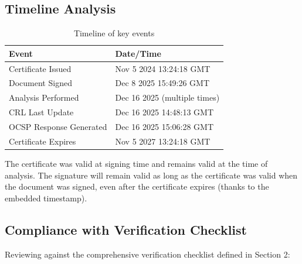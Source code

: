 \documentclass[12pt,a4paper]{article}
\begin{document}
\subsection{Timeline Analysis}

\begin{table}[H]
\centering
\begin{tabular}{ll}
\toprule
\textbf{Event} & \textbf{Date/Time} \\
\midrule
Certificate Issued & Nov 5 2024 13:24:18 GMT \\
Document Signed & Dec 8 2025 15:49:26 GMT \\
Analysis Performed & Dec 16 2025 (multiple times) \\
CRL Last Update & Dec 16 2025 14:48:13 GMT \\
OCSP Response Generated & Dec 16 2025 15:06:28 GMT \\
Certificate Expires & Nov 5 2027 13:24:18 GMT \\
\bottomrule
\end{tabular}
\caption{Timeline of key events}
\end{table}

The certificate was valid at signing time and remains valid at the time of analysis. The signature will remain valid as long as the certificate was valid when the document was signed, even after the certificate expires (thanks to the embedded timestamp).

\subsection{Compliance with Verification Checklist}

Reviewing against the comprehensive verification checklist defined in Section 2:
\end{document}
